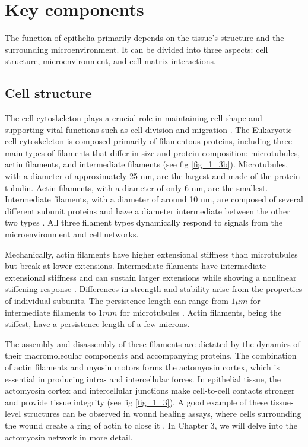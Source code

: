 \hypertarget{key-components}{%
	\section{Key components}\label{key-components}}

The function of epithelia primarily depends on the tissue's structure and the surrounding microenvironment. It can be divided into three aspects: cell structure, microenvironment, and cell-matrix interactions.

\hypertarget{cell-structure}{%
	\subsection{Cell structure}\label{cell-structure}}

The cell cytoskeleton plays a crucial role in maintaining cell shape and supporting vital functions such as cell division and migration \cite{alberts2015}. The Eukaryotic cell cytoskeleton is composed primarily of filamentous proteins, including three main types of filaments that differ in size and protein composition: microtubules, actin filaments, and intermediate filaments (see fig \ref{fig_1_3b}). Microtubules, with a diameter of approximately 25 nm, are the largest and made of the protein tubulin. Actin filaments, with a diameter of only 6 nm, are the smallest. Intermediate filaments, with a diameter of around 10 nm, are composed of several different subunit proteins and have a diameter intermediate between the other two types \cite{mofrad2009}. All three filament types dynamically respond to signals from the microenvironment and cell networks.

Mechanically, actin filaments have higher extensional stiffness than microtubules but break at lower extensions. Intermediate filaments have intermediate extensional stiffness and can sustain larger extensions while showing a nonlinear stiffening response \cite{wen2011}. Differences in strength and stability arise from the properties of individual subunits. The persistence length can range from \(1\mu m\) for intermediate filaments to \(1 mm\) for microtubules \cite{fletcher2010}. Actin filaments, being the stiffest, have a persistence length of a few microns.

The assembly and disassembly of these filaments are dictated by the dynamics of their macromolecular components and accompanying proteins. The combination of actin filaments and myosin motors forms the actomyosin cortex, which is essential in producing intra- and intercellular forces. In epithelial tissue, the actomyosin cortex and intercellular junctions make cell-to-cell contacts stronger and provide tissue integrity \cite{braga2016} (see fig \ref{fig_1_3}). A good example of these tissue-level structures can be observed in wound healing assays, where cells surrounding the wound create a ring of actin to close it \cite{brugues2014}. In Chapter 3, we will delve into the actomyosin network in more detail.

